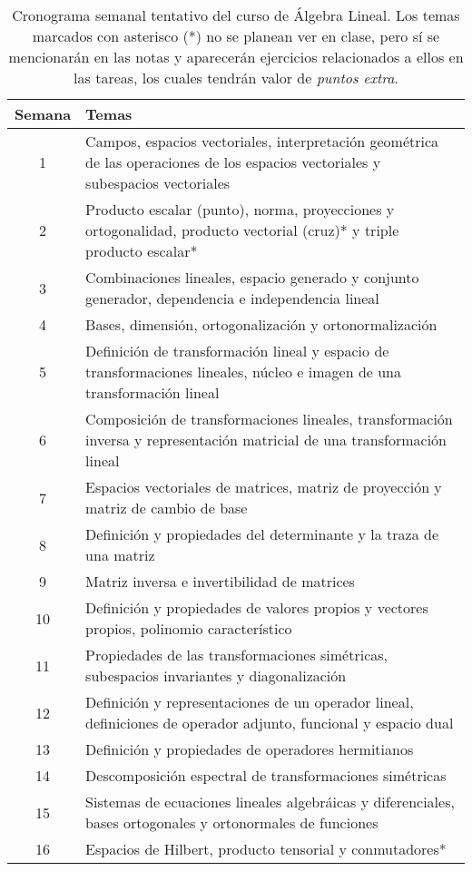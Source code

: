 \documentclass[12pt]{article}
\begin{document}
\begin{table}[ht]
    \centering
    \begin{tabularx}{\linewidth}{|c|X|}
    \hline Semana & Temas \\
    \hline 1 & Campos, espacios vectoriales, interpretación geométrica de las operaciones de los espacios vectoriales y subespacios vectoriales \\
    \hline 2 & Producto escalar (punto), norma, proyecciones y ortogonalidad, producto vectorial (cruz)* y triple producto escalar* \\
    \hline 3 & Combinaciones lineales, espacio generado y conjunto generador, dependencia e independencia lineal \\
    \hline 4 & Bases, dimensión, ortogonalización y ortonormalización \\
    \hline 5 & Definición de transformación lineal y espacio de transformaciones lineales, núcleo e imagen de una transformación lineal \\
    \hline 6 & Composición de transformaciones lineales, transformación inversa y representación matricial de una transformación lineal \\
    \hline 7 & Espacios vectoriales de matrices, matriz de proyección y matriz de cambio de base \\
    \hline 8 & Definición y propiedades del determinante y la traza de una matriz \\
    \hline 9 & Matriz inversa e invertibilidad de matrices \\
    \hline 10 & Definición y propiedades de valores propios y vectores propios, polinomio característico \\
    \hline 11 & Propiedades de las transformaciones simétricas, subespacios invariantes y diagonalización \\
    \hline 12 & Definición y representaciones de un operador lineal, definiciones de operador adjunto, funcional y espacio dual \\
    \hline 13 & Definición y propiedades de operadores hermitianos \\
    \hline 14 & Descomposición espectral de transformaciones simétricas \\
    \hline 15 & Sistemas de ecuaciones lineales algebráicas y diferenciales, bases ortogonales y ortonormales de funciones \\
    \hline 16 & Espacios de Hilbert, producto tensorial y conmutadores* \\
    \hline
    \end{tabularx}
    \caption{Cronograma semanal tentativo del curso de Álgebra Lineal. Los temas marcados con asterisco (*) no se planean ver en clase, pero sí se mencionarán en las notas y aparecerán ejercicios relacionados a ellos en las tareas, los cuales tendrán valor de \emph{puntos extra}.}
    \label{Cronograma}
\end{table}{}
\end{document}
